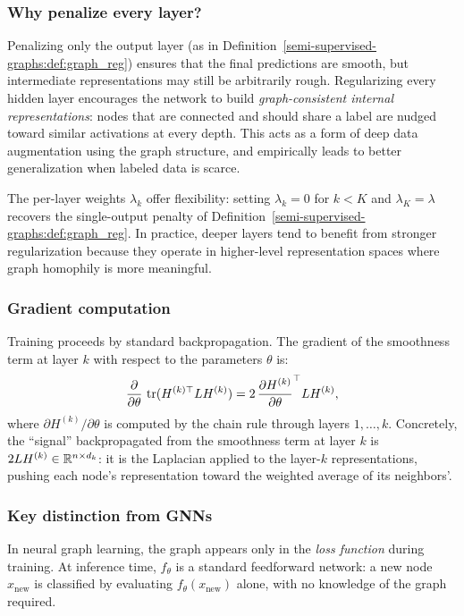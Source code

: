 \begin{notechapter}
\subsubsection*{Why penalize every layer?}

Penalizing only the output layer (as in Definition~\ref{semi-supervised-graphs:def:graph_reg}) ensures
that the final predictions are smooth, but intermediate representations may
still be arbitrarily rough. Regularizing every hidden layer encourages the
network to build \emph{graph-consistent internal representations}: nodes that
are connected and should share a label are nudged toward similar activations at
every depth. This acts as a form of deep data augmentation using the graph
structure, and empirically leads to better generalization when labeled data is
scarce.

The per-layer weights $\lambda_k$ offer flexibility: setting $\lambda_k = 0$
for $k < K$ and $\lambda_K = \lambda$ recovers the single-output penalty of
Definition~\ref{semi-supervised-graphs:def:graph_reg}. In practice, deeper layers tend to benefit
from stronger regularization because they operate in higher-level representation
spaces where graph homophily is more meaningful.

\subsubsection*{Gradient computation}

Training proceeds by standard backpropagation. The gradient of the smoothness
term at layer $k$ with respect to the parameters $\theta$ is:
\[
\frac{\partial}{\partial \theta}\,\operatorname{tr}(H^{(k)\top} L H^{(k)})
= 2\,\frac{\partial H^{(k)}}{\partial \theta}^\top L H^{(k)},
\]
where $\partial H^{(k)}/\partial \theta$ is computed by the chain rule through
layers $1, \ldots, k$. Concretely, the ``signal'' backpropagated from the
smoothness term at layer $k$ is $2L H^{(k)} \in \mathbb{R}^{n \times d_k}$: it is the
Laplacian applied to the layer-$k$ representations, pushing each node's
representation toward the weighted average of its neighbors'.

\subsubsection*{Key distinction from GNNs}

\begin{warningbox}
In neural graph learning, the graph appears only in the \emph{loss function}
during training. At inference time, $f_\theta$ is a standard feedforward
network: a new node $x_{\text{new}}$ is classified by evaluating
$f_\theta(x_{\text{new}})$ alone, with no knowledge of the graph required.


\end{warningbox}
\end{notechapter}
